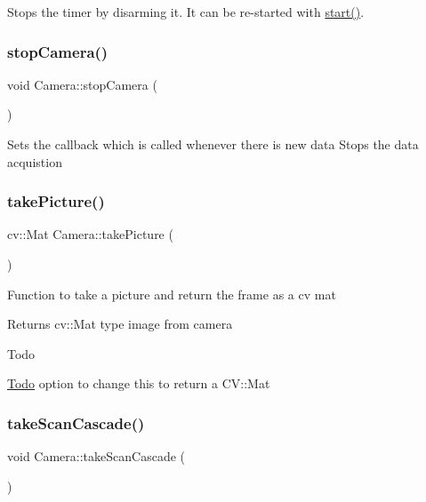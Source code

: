 Stops the timer by disarming it. It can be re-\/started with \hyperlink{classCppTimer_a64989025caa3c030c6c397ca76a2d20b}{start()}. \mbox{\label{classCamera_aac0e2e17954d17a0c15019ca74149f15}} 
\subsubsection{\texorpdfstring{stop\+Camera()}{stopCamera()}}
{\footnotesize\ttfamily void Camera\+::stop\+Camera (\begin{DoxyParamCaption}{ }\end{DoxyParamCaption})\hspace{0.3cm}{\ttfamily [inline]}}

Sets the callback which is called whenever there is new data Stops the data acquistion \mbox{\label{classCamera_a07670e99337fb322375a412222c06ada}} 
\subsubsection{\texorpdfstring{take\+Picture()}{takePicture()}}
{\footnotesize\ttfamily cv\+::\+Mat Camera\+::take\+Picture (\begin{DoxyParamCaption}{ }\end{DoxyParamCaption})}

Function to take a picture and return the frame as a cv mat

\begin{DoxyReturn}{Returns}
cv\+::\+Mat type image from camera
\end{DoxyReturn}
\begin{DoxyRefDesc}{Todo}
\item[\hyperlink{todo__todo000001}{Todo}]option to change this to return a C\+V\+::\+Mat \end{DoxyRefDesc}
\mbox{\label{classCamera_a09931f84cc8e66e4e4c1181cb1cb4af6}} 
\subsubsection{\texorpdfstring{take\+Scan\+Cascade()}{takeScanCascade()}}
{\footnotesize\ttfamily void Camera\+::take\+Scan\+Cascade (\begin{DoxyParamCaption}{ }\end{DoxyParamCaption})}


